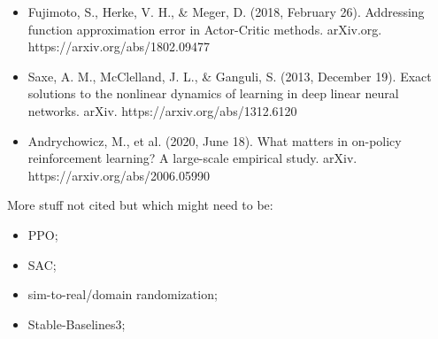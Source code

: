 \begin{itemize}
    \item Fujimoto, S., Herke, V. H., \& Meger, D. (2018, February 26). Addressing function approximation error in Actor-Critic methods. arXiv.org. https://arxiv.org/abs/1802.09477

    \item Saxe, A. M., McClelland, J. L., \& Ganguli, S. (2013, December 19). Exact solutions to the nonlinear dynamics of learning in deep linear neural networks. arXiv. https://arxiv.org/abs/1312.6120

\item Andrychowicz, M., et al. (2020, June 18). What matters in on-policy reinforcement learning? A large-scale empirical study. arXiv. https://arxiv.org/abs/2006.05990

\end{itemize}

More stuff not cited but which might need to be:
\begin{itemize}
    \item PPO;
    \item SAC;
    \item sim-to-real/domain randomization;
    \item Stable-Baselines3;
\end{itemize}